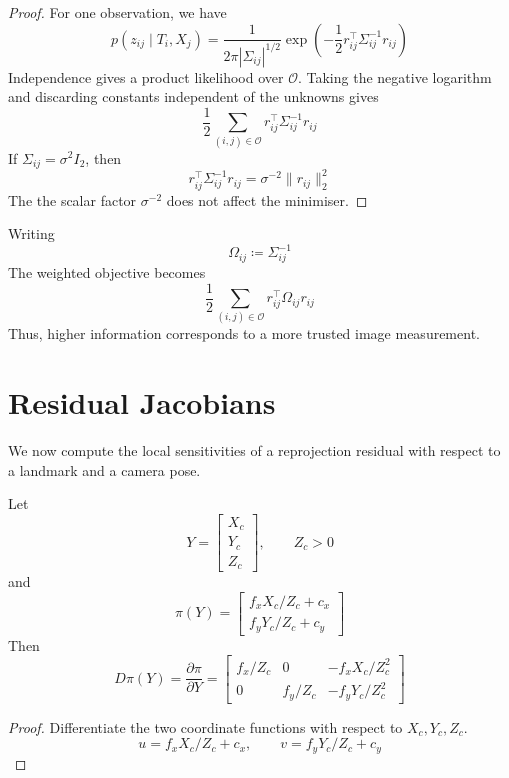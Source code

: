 \documentclass[11pt]{article}
\begin{document}
\begin{proof}
For one observation, we have
\[
p(z_{ij}\mid T_i,X_j)
=
\frac{1}{2\pi|\Sigma_{ij}|^{1/2}}
\exp\!\left(
-\frac12 r_{ij}^{\top}\Sigma_{ij}^{-1}r_{ij}
\right)
\]
Independence gives a product likelihood over \(\mathcal O\). Taking the negative logarithm and discarding constants independent of the unknowns gives
\[
\frac12
\sum_{(i,j)\in\mathcal O}
r_{ij}^{\top}\Sigma_{ij}^{-1}r_{ij}
\]
If \(\Sigma_{ij}=\sigma^2I_2\), then
\[
r_{ij}^{\top}\Sigma_{ij}^{-1}r_{ij}
=
\sigma^{-2}\|r_{ij}\|_2^2
\]
The the scalar factor \(\sigma^{-2}\) does not affect the minimiser.
\end{proof}

\begin{remark}
Writing
\[
\Omega_{ij}\coloneqq \Sigma_{ij}^{-1}
\]
The weighted objective becomes
\[
\frac12
\sum_{(i,j)\in\mathcal O}
r_{ij}^{\top}\Omega_{ij}r_{ij}
\]
Thus, higher information corresponds to a more trusted image measurement.
\end{remark}


\section{Residual Jacobians}

We now compute the local sensitivities of a reprojection residual with respect to a landmark and a camera pose.

\begin{lemma}
Let
\[
Y=
\begin{bmatrix}
X_c\\Y_c\\Z_c
\end{bmatrix},
\qquad Z_c>0
\]
and
\[
\pi(Y)=
\begin{bmatrix}
f_xX_c/Z_c+c_x\\
f_yY_c/Z_c+c_y
\end{bmatrix}
\]
Then
\[
D\pi(Y)
=
\frac{\partial \pi}{\partial Y}
=
\begin{bmatrix}
f_x/Z_c & 0 & -f_xX_c/Z_c^2\\
0 & f_y/Z_c & -f_yY_c/Z_c^2
\end{bmatrix}
\]
\end{lemma}

\begin{proof}
Differentiate the two coordinate functions with respect to \(X_c,Y_c,Z_c\).
\[
u=f_xX_c/Z_c+c_x,
\qquad
v=f_yY_c/Z_c+c_y
\]

\end{proof}
\end{document}
